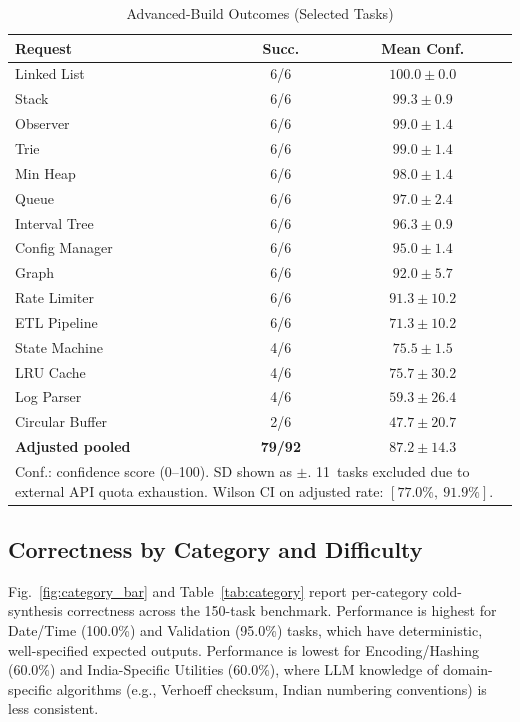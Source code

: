 \documentclass[conference]{IEEEtran}
\begin{document}
\begin{table}[htbp]
  \centering
  \caption{Advanced-Build Outcomes (Selected Tasks)}
  \label{tab:advanced}
  \renewcommand{\arraystretch}{1.2}
  \begin{tabular}{lcc}
    \toprule
    \textbf{Request} & \textbf{Succ.} & \textbf{Mean Conf.} \\
    \midrule
    Linked List        & 6/6 & $100.0\pm0.0$ \\
    Stack              & 6/6 & $99.3\pm0.9$  \\
    Observer           & 6/6 & $99.0\pm1.4$  \\
    Trie               & 6/6 & $99.0\pm1.4$  \\
    Min Heap           & 6/6 & $98.0\pm1.4$  \\
    Queue              & 6/6 & $97.0\pm2.4$  \\
    Interval Tree      & 6/6 & $96.3\pm0.9$  \\
    Config Manager     & 6/6 & $95.0\pm1.4$  \\
    Graph              & 6/6 & $92.0\pm5.7$  \\
    Rate Limiter       & 6/6 & $91.3\pm10.2$ \\
    ETL Pipeline       & 6/6 & $71.3\pm10.2$ \\
    State Machine      & 4/6 & $75.5\pm1.5$  \\
    LRU Cache          & 4/6 & $75.7\pm30.2$ \\
    Log Parser         & 4/6 & $59.3\pm26.4$ \\
    Circular Buffer    & 2/6 & $47.7\pm20.7$ \\
    \midrule
    \textbf{Adjusted pooled} & \textbf{79/92} & $87.2\pm14.3$ \\
    \bottomrule
    \multicolumn{3}{l}{\parbox{\linewidth}{\footnotesize
      Conf.: confidence score (0--100). SD shown as $\pm$.
      11~tasks excluded due to external API quota exhaustion.
      Wilson CI on adjusted rate: $[77.0\%,\ 91.9\%]$.}}
  \end{tabular}
\end{table}

\subsection{Correctness by Category and Difficulty}
\label{subsec:category}

Fig.~\ref{fig:category_bar} and Table~\ref{tab:category} report
per-category cold-synthesis correctness across the 150-task benchmark.
Performance is highest for Date/Time (100.0\%) and Validation (95.0\%)
tasks, which have deterministic, well-specified expected outputs.
Performance is lowest for Encoding/Hashing (60.0\%) and India-Specific
Utilities (60.0\%), where LLM knowledge of domain-specific algorithms
(e.g., Verhoeff checksum, Indian numbering conventions) is less
consistent.
\end{document}
